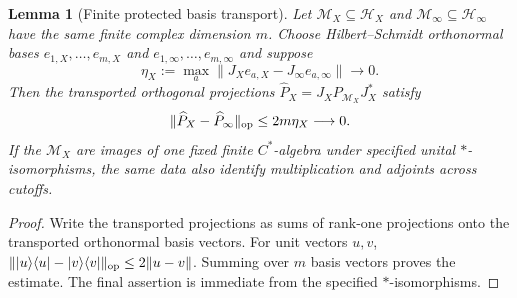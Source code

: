\documentclass[11pt]{article}
\numberwithin{equation}{section}
\newtheorem{lemma}[theorem]{Lemma}
\theoremstyle{definition}
\theoremstyle{remark}
\newcommand{\M}{\mathcal M}
\begin{document}
\begin{lemma}[Finite protected basis transport]
\label{lem:protected-basis-transport}
Let $\M_X\subseteq\mathscr H_X$ and $\M_\infty\subseteq\mathscr H_\infty$
have the same finite complex dimension $m$.  Choose Hilbert--Schmidt
orthonormal bases $e_{1,X},\ldots,e_{m,X}$ and
$e_{1,\infty},\ldots,e_{m,\infty}$ and suppose
\begin{equation}
 \eta_X:=\max_a\|J_Xe_{a,X}-J_\infty e_{a,\infty}\|\longrightarrow0.
 \label{eq:protected-basis-transport}
\end{equation}
Then the transported orthogonal projections
$\widehat P_X=J_XP_{\M_X}J_X^*$ satisfy
\begin{equation}
 \|\widehat P_X-\widehat P_\infty\|_{\rm op}
 \le2m\eta_X\longrightarrow0.
 \label{eq:protected-projection-transport}
\end{equation}
If the $\M_X$ are images of one fixed finite $C^*$-algebra under specified
unital $*$-isomorphisms, the same data also identify multiplication and
adjoints across cutoffs.
\end{lemma}

\begin{proof}
Write the transported projections as sums of rank-one projections onto the
transported orthonormal basis vectors.  For unit vectors $u,v$,
$\||u\rangle\langle u|-|v\rangle\langle v|\|_{\rm op}\le2\|u-v\|$.
Summing over $m$ basis vectors proves the estimate.  The final assertion is
immediate from the specified $*$-isomorphisms.
\end{proof}
\end{document}

